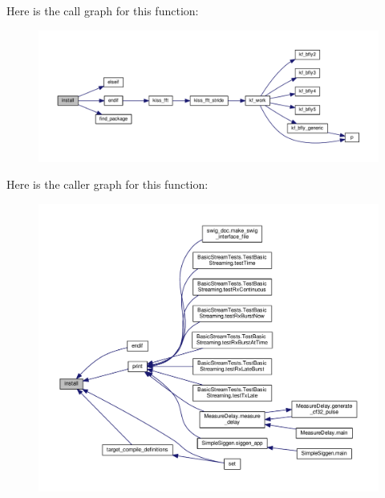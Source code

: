 Here is the call graph for this function\+:
\nopagebreak
\begin{figure}[H]
\begin{center}
\leavevmode
\includegraphics[width=350pt]{d3/d46/limesuite-dev_2src_2ConnectionFTDI_2CMakeLists_8txt_a61dd9b5c2161aa5a19b1365aab614dc6_cgraph}
\end{center}
\end{figure}




Here is the caller graph for this function\+:
\nopagebreak
\begin{figure}[H]
\begin{center}
\leavevmode
\includegraphics[width=350pt]{d3/d46/limesuite-dev_2src_2ConnectionFTDI_2CMakeLists_8txt_a61dd9b5c2161aa5a19b1365aab614dc6_icgraph}
\end{center}
\end{figure}


